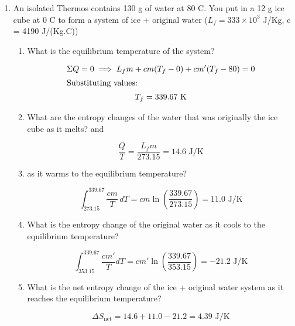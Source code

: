 \documentclass{zc-ust-hw}
\begin{document}
\begin{enumerate}
  \item An isolated Thermos contains 130 g of water at 80 \textdegree C. You
    put in a 12 g ice cube at 0 \textdegree C to form a system of ice + original
    water ($L_f = 333\times 10^3$ J/Kg, c = 4190 J/(Kg.C))
    \begin{enumerate}
      \item What is the equilibrium temperature of the system?
        \begin{sol}
          \begin{gather}
            \Sigma Q=0 \implies L_fm+cm(T_f-0)+cm'(T_f-80)=0 \\
            \intertext{Substituting values:}
            T_f = 339.67 \text{ K}
          \end{gather}
        \end{sol}
      \item What are the entropy changes of the water that was originally the
        ice cube as it melts? and
        \begin{sol}
          \begin{equation}
            \frac{Q}{T} = \frac{L_fm}{273.15} = 14.6 \text{ J/K}
          \end{equation}
        \end{sol}
      \item as it warms to the equilibrium temperature?
        \begin{sol}
          \begin{equation}
            \int_{273.15}^{339.67} \frac{cm}{T}\,dT=cm \ln \left(\frac{339.67}{273.15}\right) = 11.0 \text{ J/K}
          \end{equation}
        \end{sol}
      \item What is the entropy change of the original water as it cools to the
        equilibrium temperature?
        \begin{sol}
          \begin{equation}
            \int_{353.15}^{339.67} \frac{cm'}{T}dT = cm'\ln \left( \frac{339.67}{353.15} \right)  = -21.2 \text{ J/K}
          \end{equation}
        \end{sol}
      \item What is the net entropy change of the ice + original water system
        as it reaches the equilibrium temperature?
        \begin{sol}
          \begin{equation}
            \Delta S_\text{net} = 14.6 + 11.0 - 21.2 = 4.39 \text{ J/K}
          \end{equation}
        \end{sol}
  \end{enumerate}


\end{enumerate}
\end{document}

